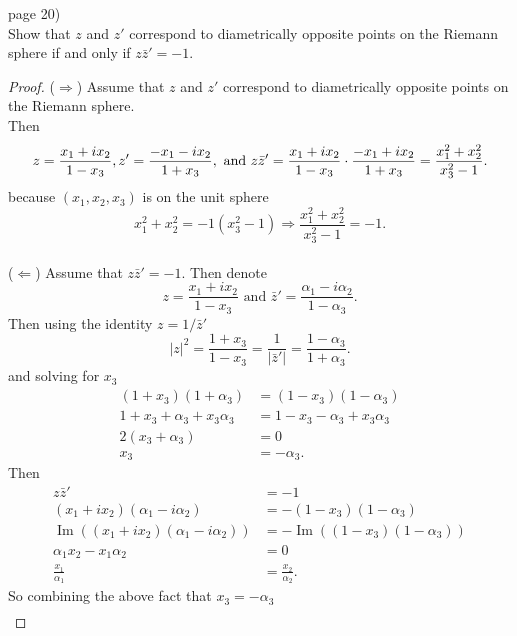 \documentclass{article}
\newenvironment{problem}[2][Problem]{\begin{trivlist}
\item[\hskip \labelsep {\bfseries #1}\hskip \labelsep {\bfseries #2.}]}{\end{trivlist}}
\begin{document}
\pagebreak

\begin{problem}{1} (page 20) \\
  Show that $z$ and $z'$ correspond to diametrically opposite points on the
  Riemann sphere if and only if $z\bar{z}' = -1$.
\end{problem}

\begin{proof}
  ($\Longrightarrow$) Assume that $z$ and $z'$ correspond to diametrically opposite points on the Riemann sphere.\\
  Then \[
    z = \frac{x_1 + ix_2}{1 - x_3},
    z' = \frac{-x_1 - ix_2}{1 + x_3}, \text{ and } \\
    z\bar{z}' = \frac{x_1 + ix_2}{1 - x_3} \cdot \frac{-x_1 + ix_2}{1 + x_3} =
    \frac{x_1^2 + x_2^2}{x_3^2 - 1}.
  \] because $(x_1, x_2, x_3)$ is on the unit sphere \[
    x_1^2 + x_2^2 = -1(x_3^2 - 1) \Longrightarrow \frac{x_1^2 + x_2^2}{x_3^2 - 1} = -1.
  \]
  \\
  ($\Longleftarrow$) Assume that $z\bar{z}' = -1$.
  Then denote \[
    z = \frac{x_1 + ix_2}{1 - x_3} \text{ and } \bar{z}' = \frac{\alpha_1 - i\alpha_2}{1 - \alpha_3}.
  \] Then using the identity $z = 1/\bar{z}'$ \[
    |z|^2
    = \frac{1 + x_3}{1 - x_3}
    = \frac{1}{|\bar{z}'|}
    = \frac{1 - \alpha_3}{1 + \alpha_3}.
  \] and solving for $x_3$ \begin{align*}
    (1 + x_3)(1 + \alpha_3) &= (1 - x_3)(1 - \alpha_3) \\
    1 + x_3 + \alpha_3 + x_3\alpha_3 &= 1 - x_3 - \alpha_3 + x_3\alpha_3 \\
    2(x_3 + \alpha_3) &= 0 \\
    x_3 &= -\alpha_3.
  \end{align*}
  Then \begin{align*}
    z\bar{z}' & = -1 \\
    (x_1 + ix_2)(\alpha_1 - i\alpha_2) &= -(1 - x_3)(1 - \alpha_3) \\
    \operatorname{Im}((x_1 + ix_2)(\alpha_1 - i\alpha_2)) &= -\operatorname{Im}((1 - x_3)(1 - \alpha_3)) \\
    \alpha_1x_2 - x_1\alpha_2 &= 0 \\
    \frac{x_1}{\alpha_1} &= \frac{x_2}{\alpha_2}.
  \end{align*}
  So combining the above fact that $x_3 = -\alpha_3$ \begin{align*}

\end{align*}
\end{proof}
\end{document}
